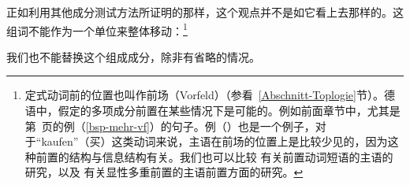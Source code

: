 正如利用其他成分测试方法所证明的那样，这个观点并不是如它看上去那样的。这组词不能作为一个单位来整体移动：\footnote{定式动词前的位置也叫作前场（Vorfeld）（参看~\ref{Abschnitt-Toplogie}节）。德语中，假定的多项成分前置在某些情况下是可能的。例如前面章节中，尤其是第~\pageref{bsp-mehr-vf}页的例（\ref{bsp-mehr-vf}）的句子。例（）也是一个例子，对于“kaufen”（买）这类动词来说，主语在前场的位置上是比较少见的，因为这种前置的结构与信息结构有关。我们也可以比较\citealp{dKM2003a} 有关前置动词短语的主语的研究，以及\citealp[]{BC2010a} 有关显性多重前置的主语前置方面的研究。}
\z

\noindent
我们也不能替换这个组成成分，除非有省略的情况。

